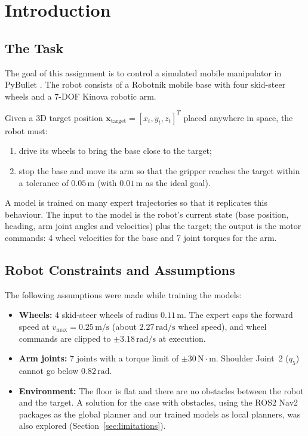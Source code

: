 \documentclass[conference]{IEEEtran}
\begin{document}
\section{Introduction}

\subsection{The Task}
The goal of this assignment is to control a simulated mobile manipulator in PyBullet \cite{coumans2016pybullet}. The robot consists of a Robotnik mobile base with four skid-steer wheels and a 7-DOF Kinova robotic arm.

Given a 3D target position $\mathbf{x}_{\text{target}} = [x_t, y_t, z_t]^T$ placed anywhere in space, the robot must:
\begin{enumerate}
    \item drive its wheels to bring the base close to the target;
    \item stop the base and move its arm so that the gripper reaches the target within a tolerance of $0.05\,\text{m}$ (with $0.01\,\text{m}$ as the ideal goal).
\end{enumerate}
A model is trained on many expert trajectories so that it replicates this behaviour. The input to the model is the robot's current state (base position, heading, arm joint angles and velocities) plus the target; the output is the motor commands: 4 wheel velocities for the base and 7 joint torques for the arm.

\subsection{Robot Constraints and Assumptions}
The following assumptions were made while training the models:
\begin{itemize}
    \item \textbf{Wheels:} 4 skid-steer wheels of radius $0.11\,\text{m}$. The expert caps the forward speed at $v_{\max} = 0.25\,\text{m/s}$ (about $2.27\,\text{rad/s}$ wheel speed), and wheel commands are clipped to $\pm 3.18\,\text{rad/s}$ at execution.
    \item \textbf{Arm joints:} 7 joints with a torque limit of $\pm 30\,\text{N}\cdot\text{m}$. Shoulder Joint~2 ($q_5$) cannot go below $0.82\,\text{rad}$.
    \item \textbf{Environment:} The floor is flat and there are no obstacles between the robot and the target. A solution for the case with obstacles, using the ROS2 Nav2 packages as the global planner and our trained models as local planners, was also explored (Section~\ref{sec:limitations}).
\end{itemize}
\end{document}
